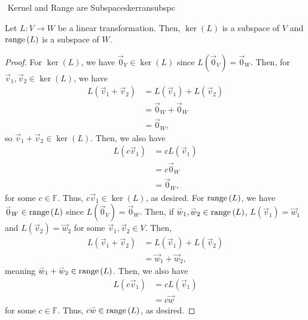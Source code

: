        \begin{theorem}{\Stop\,\,Kernel and Range are Subspaces}{kerransubspc}

            Let \(L:V\to W\) be a linear transformation. Then, \(\ker(L)\) is a subspace of \(V\) and \(\text{range\,}(L)\) is a subspace of \(W\).
            \begin{proof}
                For \(\ker(L)\), we have \(\vec{0}_V\in\ker(L)\) since \(L(\vec{0}_V)=\vec{0}_W\). Then, for \(\vec{v}_1,\vec{v}_2\in \ker(L)\), we have
                \begin{align*}
                    L(\vec{v}_1+\vec{v}_2)&=L(\vec{v}_1)+L(\vec{v}_2) \\
                    &=\vec{0}_W+\vec{0}_W \\
                    &=\vec{0}_W,
                \end{align*}
                so \(\vec{v}_1+\vec{v}_2\in\ker(L)\). Then, we also have
                \begin{align*}
                    L(c\vec{v}_1)&=cL(\vec{v}_1) \\
                    &=c\vec{0}_W \\
                    &=\vec{0}_W,
                \end{align*}
                for some \(c\in\mathbb{F}\). Thus, \(c\vec{v}_1\in\ker(L)\), as desired. For \(\text{range\,}(L)\), we have \(\overset{_{\rightharpoonup}}{0}_W\in\text{range\,}(L)\) since \(L(\vec{0}_V)=\vec{0}_W\). Then, if \(\overset{_{\rightharpoonup}}{w}_1,\overset{_{\rightharpoonup}}{w}_2\in\text{range\,}(L)\), \(L(\vec{v}_1)=\vec{w}_1\) and \(L(\vec{v}_2)=\vec{w}_2\) for some \(\vec{v}_1,\vec{v}_2\in V\). Then,
                \begin{align*}
                    L(\vec{v}_1+\vec{v}_2)&=L(\vec{v}_1)+L(\vec{v}_2) \\
                    &=\vec{w}_1+\vec{w}_2,
                \end{align*}
                meaning \(\overset{_{\rightharpoonup}}{w}_1+\overset{_{\rightharpoonup}}{w}_2\in \text{range\,}(L)\). Then, we also have
                \begin{align*}
                    L(c\vec{v}_1)&=cL(\vec{v}_1) \\
                    &=c\vec{w}
                \end{align*}
                for some \(c\in\mathbb{F}\). Thus, \(c\overset{_{\rightharpoonup}}{w}\in\text{range\,}(L)\), as desired.
            \end{proof}
            
        \end{theorem}

\pagebreak

